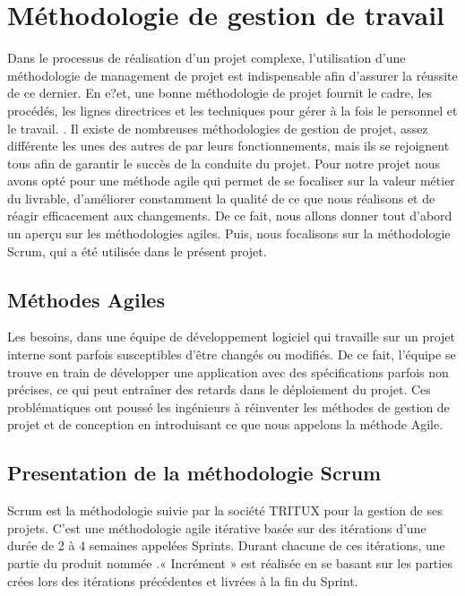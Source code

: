 \section{Méthodologie de gestion de  travail }
Dans le processus de réalisation d'un projet complexe, l'utilisation d'une méthodologie de 
management  de  projet  est  indispensable  afin  d'assurer  la  réussite  de  ce  dernier.  En  e?et, 
une  bonne  méthodologie  de  projet  fournit  le  cadre,  les  procédés,  les  lignes  directrices  et 
les  techniques  pour  gérer  à  la  fois  le personnel  et  le  travail. 
.\newline
Il existe  de  nombreuses  méthodologies  de  gestion  de  projet,  assez  différente  les  unes  des 
autres  de  par  leurs  fonctionnements,  mais  ils  se  rejoignent  tous  afin  de  garantir  le  succès 
de  la  conduite  du  projet. \newline
Pour notre projet nous avons opté pour une méthode agile qui permet de se focaliser sur la valeur métier du livrable, d'améliorer constamment la qualité de ce que nous réalisons et de réagir efficacement aux changements.
De ce fait, nous allons donner tout d'abord un aperçu sur les méthodologies agiles. Puis, nous focalisons sur la méthodologie Scrum, qui a été utilisée dans le présent projet.
\subsection{Méthodes Agiles}
Les besoins, dans une équipe de développement logiciel qui travaille sur un projet interne sont parfois susceptibles d'être changés ou modifiés. De ce fait, l'équipe se trouve
en train de développer une application avec des spécifications parfois non précises, ce qui
peut entraîner des retards dans le déploiement du projet. Ces problématiques ont poussé
les ingénieurs à réinventer les méthodes de gestion de projet et de conception en introduisant ce que nous appelons la méthode Agile.
\subsection{Presentation de la méthodologie Scrum}
Scrum est la méthodologie suivie par la société TRITUX pour la gestion de ses projets. C'est une méthodologie agile itérative basée sur des itérations d'une durée de 2 à 4 semaines appelées Sprints.
Durant chacune de ces itérations, une partie du produit nommée .« Incrément » est réalisée en se basant sur les parties crées lors des itérations précédentes et livrées à la fin du Sprint.

